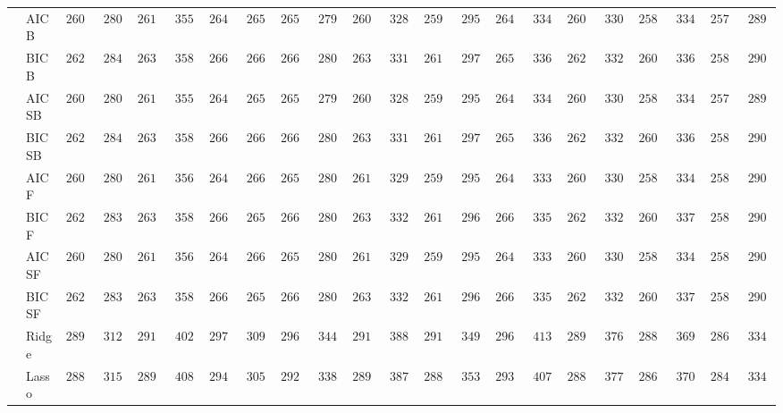 \begin{tabular}{p{0.2cm}p{1cm}|p{0.6cm}p{0.6cm}|p{0.6cm}p{0.6cm}p{0.6cm}p{0.6cm}p{0.6cm}p{0.6cm}|p{0.6cm}p{0.6cm}p{0.6cm}p{0.6cm}p{0.6cm}p{0.6cm}|p{0.6cm}p{0.6cm}p{0.6cm}p{0.6cm}p{0.6cm}p{0.6cm}}
 & AIC B  & $2607.71$ & $280.16$ & $2614.22$ & $355.52$ & $2648.47$ & $265.41$ & $2655.37$ & $279.76$ & $2609.59$ & $328.57$ & $2594.10$ & $295.58$ & $2645.77$ & $334.14$ & $2602.01$ & $330.57$ & $2588.92$ & $334.77$ & $2578.21$ & $289.28$ \\
 & BIC B  & $2627.22$ & $284.50$ & $2631.19$ & $358.98$ & $2665.70$ & $266.20$ & $2669.75$ & $280.79$ & $2630.36$ & $331.72$ & $2612.16$ & $297.16$ & $2659.97$ & $336.50$ & $2621.06$ & $332.75$ & $2604.95$ & $336.31$ & $2589.61$ & $290.71$ \\
 & AIC SB  & $2607.71$ & $280.16$ & $2614.22$ & $355.52$ & $2648.47$ & $265.41$ & $2655.37$ & $279.76$ & $2609.59$ & $328.57$ & $2594.10$ & $295.58$ & $2645.77$ & $334.14$ & $2602.01$ & $330.57$ & $2588.92$ & $334.77$ & $2578.21$ & $289.28$ \\
 & BIC SB  & $2627.22$ & $284.50$ & $2631.19$ & $358.98$ & $2665.70$ & $266.20$ & $2669.75$ & $280.79$ & $2630.36$ & $331.72$ & $2612.16$ & $297.16$ & $2659.97$ & $336.50$ & $2621.06$ & $332.75$ & $2604.95$ & $336.31$ & $2589.61$ & $290.71$ \\
 & AIC F  & $2607.82$ & $280.27$ & $2614.72$ & $356.13$ & $2649.94$ & $266.07$ & $2657.80$ & $280.68$ & $2610.04$ & $329.03$ & $2595.50$ & $295.85$ & $2649.72$ & $333.83$ & $2602.34$ & $330.56$ & $2589.92$ & $334.98$ & $2580.08$ & $290.02$ \\
 & BIC F  & $2627.49$ & $283.86$ & $2631.19$ & $358.98$ & $2666.01$ & $265.94$ & $2669.75$ & $280.79$ & $2631.15$ & $332.26$ & $2612.39$ & $296.99$ & $2660.21$ & $335.28$ & $2621.06$ & $332.75$ & $2606.21$ & $337.87$ & $2589.59$ & $290.70$ \\
 & AIC SF  & $2607.82$ & $280.27$ & $2614.72$ & $356.13$ & $2649.94$ & $266.07$ & $2657.80$ & $280.68$ & $2610.04$ & $329.03$ & $2595.54$ & $295.78$ & $2649.72$ & $333.83$ & $2602.34$ & $330.56$ & $2589.92$ & $334.98$ & $2580.08$ & $290.02$ \\
 & BIC SF  & $2627.49$ & $283.86$ & $2631.19$ & $358.98$ & $2666.01$ & $265.94$ & $2669.75$ & $280.79$ & $2631.15$ & $332.26$ & $2612.39$ & $296.99$ & $2660.50$ & $335.73$ & $2621.06$ & $332.75$ & $2606.21$ & $337.87$ & $2589.59$ & $290.70$ \\
 & Ridge  & $2899.43$ & $312.70$ & $2915.72$ & $402.81$ & $2972.46$ & $309.91$ & $2968.64$ & $344.62$ & $2912.15$ & $388.88$ & $2912.24$ & $349.42$ & $2964.82$ & $413.08$ & $2895.37$ & $376.78$ & $2887.22$ & $369.96$ & $2867.19$ & $334.43$ \\
 & Lasso  & $2886.41$ & $315.83$ & $2897.49$ & $408.74$ & $2941.61$ & $305.34$ & $2929.17$ & $338.39$ & $2898.28$ & $387.07$ & $2886.85$ & $353.35$ & $2931.39$ & $407.10$ & $2880.23$ & $377.65$ & $2868.14$ & $370.32$ & $2846.76$ & $334.82$ \\

\end{tabular}
